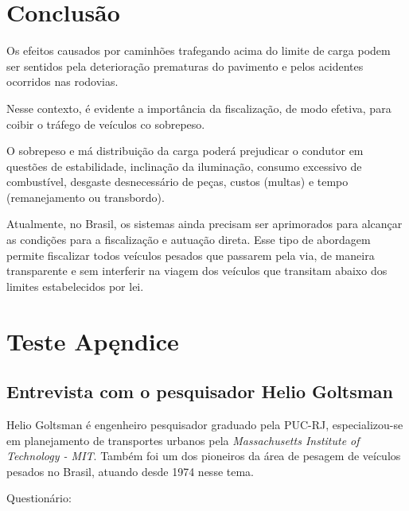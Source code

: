 \documentclass{ufscThesis}
\begin{document}

\chapter{Conclusão}\label{conclusao}

Os efeitos causados por caminhões trafegando acima do limite de carga podem ser sentidos pela deterioração prematuras do pavimento e pelos acidentes ocorridos nas rodovias.

Nesse contexto, é evidente a importância da fiscalização, de modo efetiva, para coibir o tráfego de veículos co sobrepeso.

O sobrepeso e má distribuição da carga poderá prejudicar o condutor em questões de estabilidade, inclinação da iluminação, consumo excessivo de combustível, desgaste desnecessário de peças, custos (multas) e tempo (remanejamento ou transbordo).

Atualmente, no Brasil, os sistemas ainda precisam ser aprimorados para alcançar as condições para a fiscalização e autuação direta. Esse tipo de abordagem permite fiscalizar todos veículos pesados que passarem pela via, de maneira transparente e sem interferir na viagem dos veículos que transitam abaixo dos limites estabelecidos por lei.






\apendice
\chapter{Teste Apęndice}
\section{Entrevista com o pesquisador Helio Goltsman}

Helio Goltsman é engenheiro pesquisador graduado pela PUC-RJ, especializou-se em planejamento de transportes urbanos pela \textit{Massachusetts Institute of Technology - MIT}. Também foi um dos pioneiros da área de pesagem de veículos pesados no Brasil, atuando desde 1974 nesse tema.

Questionário:
\end{document}
